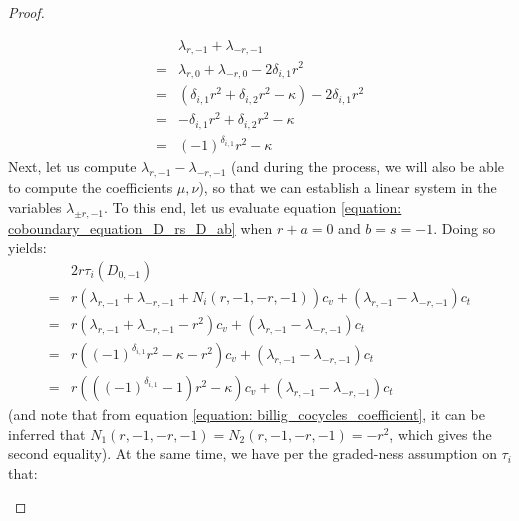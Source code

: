 \begin{proof}
\begin{itemize}
                        $$
                            \begin{aligned}
                                & \lambda_{r, -1} + \lambda_{-r, -1}
                                \\
                                = & \lambda_{r, 0} + \lambda_{-r, 0} - 2\delta_{i, 1} r^2
                                \\
                                = & ( \delta_{i, 1} r^2 + \delta_{i, 2} r^2 - \kappa ) - 2\delta_{i, 1} r^2
                                \\
                                = & -\delta_{i, 1} r^2 + \delta_{i, 2} r^2 - \kappa
                                \\
                                = & (-1)^{\delta_{i, 1}} r^2 - \kappa
                            \end{aligned}
                        $$
                    Next, let us compute $\lambda_{r, -1} - \lambda_{-r, -1}$ (and during the process, we will also be able to compute the coefficients $\mu, \nu$), so that we can establish a linear system in the variables $\lambda_{\pm r, -1}$. To this end, let us evaluate equation \eqref{equation: coboundary_equation_D_rs_D_ab} when $r + a = 0$ and $b = s = -1$. Doing so yields:
                        $$
                            \begin{aligned}
                                & 2r \tau_i(D_{0, -1})
                                \\
                                = & r\left( \lambda_{r, -1} + \lambda_{-r, -1} + N_i(r, -1, -r, -1) \right) c_v + \left( \lambda_{r, -1} - \lambda_{-r, -1} \right) c_t
                                \\
                                = & r\left( \lambda_{r, -1} + \lambda_{-r, -1} - r^2 \right) c_v + \left( \lambda_{r, -1} - \lambda_{-r, -1} \right) c_t
                                \\
                                = & r\left( (-1)^{\delta_{i, 1}} r^2 - \kappa - r^2 \right) c_v + \left( \lambda_{r, -1} - \lambda_{-r, -1} \right) c_t
                                \\
                                = & r\left( ((-1)^{\delta_{i, 1}} - 1) r^2 - \kappa \right) c_v + \left( \lambda_{r, -1} - \lambda_{-r, -1} \right) c_t
                            \end{aligned}
                        $$
                    (and note that from equation \eqref{equation: billig_cocycles_coefficient}, it can be inferred that $N_1(r, -1, -r, -1) = N_2(r, -1, -r, -1) = -r^2$, which gives the second equality). At the same time, we have per the graded-ness assumption on $\tau_i$ that:

\end{itemize}
\end{proof}
